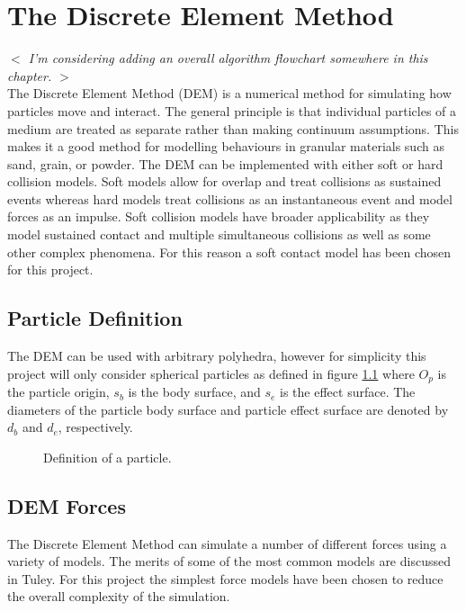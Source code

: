 \documentclass[10pt,a4paper,titlepage]{report}
\begin{document}
\chapter{The Discrete Element Method}
\label{ch:The Discrete Element Method}
\textit{$<$ I'm considering adding an overall algorithm flowchart somewhere in this chapter. $>$}
\\The Discrete Element Method (DEM) is a numerical method for simulating how particles move and interact. The general principle is that individual particles of a medium are treated as separate rather than making continuum assumptions. This makes it a good method for modelling behaviours in granular materials such as sand, grain, or powder. The DEM can be implemented with either soft or hard collision models. Soft models allow for overlap and treat collisions as sustained events whereas hard models treat collisions as an instantaneous event and model forces as an impulse. Soft collision models have broader applicability as they model sustained contact and multiple simultaneous collisions as well as some other complex phenomena\cite{softvshard}. For this reason a soft contact model has been chosen for this project.
\section{Particle Definition}
The DEM can be used with arbitrary polyhedra, however for simplicity this project will only consider spherical particles as defined in figure \ref{fig:particle} where $O_p$ is the particle origin, $s_b$ is the body surface, and $s_e$ is the effect surface. The diameters of the particle body surface and particle effect surface are denoted by $d_b$ and $d_e$, respectively.
\begin{figure}[!ht]
\centering

\caption{Definition of a particle.}
\label{fig:particle}
\end{figure}
\section{DEM Forces}
\label{sec:DEM Forces}
The Discrete Element Method can simulate a number of different forces using a variety of models. The merits of some of the most common models are discussed in Tuley\cite{tuley}. For this project the simplest force models have been chosen to reduce the overall complexity of the simulation.
\end{document}
